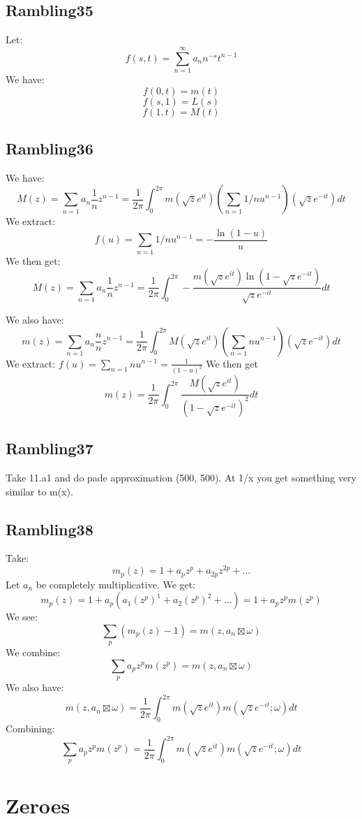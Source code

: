 \documentclass[a4paper]{amsart}
\begin{document}
\subsection{Rambling35}
Let: 
$$f(s, t) = \sum_{n = 1}^\infty a_n n^{-s} t^{n - 1}$$
We have: 
$$f(0, t) = m(t)$$
$$f(s, 1) = L(s)$$
$$f(1, t) = M(t)$$


\subsection{Rambling36}
We have:
$$M(z) = \sum_{n = 1} a_n \frac{1}{n} z^{n - 1} = \frac{1}{2\pi} \int_0^{2\pi} m(\sqrt{z}e^{it}) (\sum_{n = 1} 1/n u^{n - 1})(\sqrt{z}e^{-it}) dt$$
We extract:
$$f(u) = \sum_{n = 1} 1/n u^{n - 1} = -\frac{\ln(1 - u)}{u}$$
We then get:
$$M(z) = \sum_{n = 1} a_n \frac{1}{n} z^{n - 1} = \frac{1}{2\pi} \int_0^{2\pi} -\frac{m(\sqrt{z}e^{it})\ln(1 - \sqrt{z}e^{-it})}{\sqrt{z}e^{-it}} dt$$

We also have:
$$m(z) = \sum_{n = 1} a_n \frac{n}{n} z^{n - 1} = \frac{1}{2\pi} \int_0^{2\pi} M(\sqrt{z}e^{it}) (\sum_{n = 1} n u^{n - 1})(\sqrt{z}e^{-it}) dt$$
We extract:
$f(u) = \sum_{n = 1} n u^{n - 1} = \frac{1}{(1 - u)^2}$
We then get
$$m(z) = \frac{1}{2\pi} \int_0^{2\pi} \frac{M(\sqrt{z}e^{it})}{(1 - \sqrt{z}e^{-it})^2} dt$$


\subsection{Rambling37}
Take 11.a1 and do pade approximation (500, 500). At 1/x you get something very similar to m(x).


\subsection{Rambling38}
Take:
$$m_p(z) = 1 + a_p z^p + a_{2p} z^{2p} + \ldots$$
Let $a_n$ be completely multiplicative. We get:
$$m_p(z) = 1 + a_p (a_1 (z^p)^1 + a_{2} (z^{p})^2 + \ldots) = 1 + a_p z^p m(z^p)$$
We see: 
$$\sum_p (m_p(z) - 1) = m(z, a_n \boxtimes \omega)$$
We combine:
$$\sum_p a_p z^p m(z^p) = m(z, a_n \boxtimes \omega)$$
We also have:
$$m(z, a_n \boxtimes \omega) = \frac{1}{2\pi} \int_0^{2\pi} m(\sqrt{z} e^{it}) m(\sqrt{z} e^{-it}; \omega)dt$$
Combining:
$$\sum_p a_p z^p m(z^p) = \frac{1}{2\pi} \int_0^{2\pi} m(\sqrt{z} e^{it}) m(\sqrt{z} e^{-it}; \omega)dt$$

\section{Zeroes}
\end{document}
